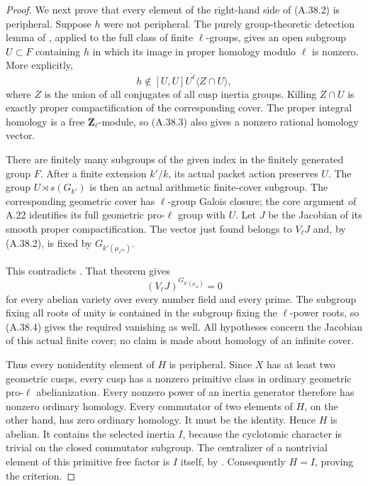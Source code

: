 \begin{proof}
We next prove that every element of the right-hand
side of (A.38.2) is peripheral. Suppose \(h\) were
not peripheral. The purely group-theoretic detection
lemma of \cite[Lemma 2.1.4, printed pp.96--97]{Nakamura1994},
applied to the full class of finite \(\ell\)-groups,
gives an open subgroup \(U\subset F\) containing
\(h\) in which its image in proper homology modulo
\(\ell\) is nonzero. More explicitly,
\[
 h\notin\overline{[U,U]U^\ell
                  \langle Z\cap U\rangle},          \tag{A.38.3}
\]
where \(Z\) is the union of all conjugates of all
cusp inertia groups. Killing \(Z\cap U\) is exactly
proper compactification of the corresponding cover.
The proper integral homology is a free
\(\mathbf Z_\ell\)-module, so (A.38.3) also gives
a nonzero rational homology vector.

There are finitely many subgroups of the given index
in the finitely generated group \(F\). After a finite
extension \(k'/k\), its actual packet action preserves
\(U\). The group \(U\rtimes s(G_{k'})\) is then
an actual arithmetic finite-cover subgroup. The
corresponding geometric cover has \(\ell\)-group
Galois closure; the core argument of A.22 identifies
its full geometric pro-\(\ell\) group with \(U\).
Let \(J\) be the Jacobian of its smooth proper
compactification. The vector just found belongs to
\(V_\ell J\) and, by (A.38.2), is fixed by
\(G_{k'(\mu_{\ell^\infty})}\).

This contradicts \cite[Theorem 3, printed p.315,
proof pp.317--318]{A_RibetCyclotomic1981}.
That theorem gives
\[
       (V_\ell J)^{G_{k'(\mu_\infty)}}=0             \tag{A.38.4}
\]
for every abelian variety over every number field
and every prime. The subgroup fixing all roots of
unity is contained in the subgroup fixing the
\(\ell\)-power roots, so (A.38.4) gives the required
vanishing as well. All hypotheses concern the
Jacobian of this actual finite cover; no claim is
made about homology of an infinite cover.

Thus every nonidentity element of \(H\) is peripheral.
Since \(X\) has at least two geometric cusps, every
cusp has a nonzero primitive class in ordinary
geometric pro-\(\ell\) abelianization. Every nonzero
power of an inertia generator therefore has nonzero
ordinary homology. Every commutator of two elements
of \(H\), on the other hand, has zero ordinary
homology. It must be the identity. Hence \(H\) is
abelian. It contains the selected inertia \(I\),
because the cyclotomic character is trivial on
the closed commutator subgroup. The centralizer
of a nontrivial element of this primitive free
factor is \(I\) itself, by
\cite[Lemma 2.1.2]{Nakamura1994}. Consequently
\(H=I\), proving the criterion.


\end{proof}
